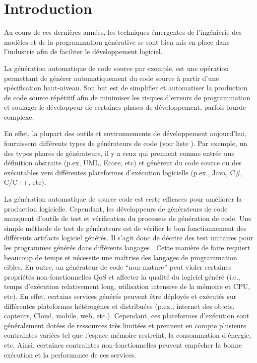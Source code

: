 \chapter*{Introduction}

Au cours de ces dernières années, les techniques émergentes de l’ingénierie des modèles et de la programmation générative se sont bien mis en place dans l’industrie afin de faciliter le développement logiciel.

La génération automatique de code source par exemple, est une opération permettant de générer automatiquement du code source à partir d’une spécification haut-niveau. Son but est de simplifier et automatiser la production de code source répétitif afin de minimiser les risques d'erreurs de programmation et soulager le développeur de certaines phases de développement, parfois lourde complexe.

En effet, la plupart des outils et environnements de développement aujourd’hui, fournissent différents types de générateurs de code (voir liste \cite{liste_generateurs}). Par exemple, un des types phares de générateurs, il y a ceux qui prennent comme entrée une définition abstraite (p.ex, UML, Ecore, etc) et génèrent du code source ou des exécutables vers différentes plateformes d’exécution logicielle (p.ex., Java, C\#, C/C++, etc).

La génération automatique de source code est certe efficaces pour améliorer la production logicielle. Cependant, les développeurs de générateurs de code manquent d’outils de test et vérification du processus de génération de code. Une simple méthode de test de générateurs est de vérifier le bon fonctionnement des différents artifacts logiciel générés. Il s’agit donc de décrire des test unitaires pour les programmes générés dans différents langages . Cette manière de faire requiert beaucoup de temps et nécessite une maîtrise des langages de programmation cibles.
En outre, un générateur de code “non-mature” peut violer certaines propriétés non-fonctionnelles QoS et affecter la qualité du logiciel généré (i.e., temps d'exécution relativement long, utilisation intensive de la mémoire et CPU, etc). En effet, certains services générés peuvent être déployés et exécutés sur différentes plateformes hétérogènes et distribuées (p.ex., internet des objets, capteurs, Cloud, mobile, web, etc.). Cependant, ces plateformes d’exécution sont généralement dotées de ressources très limitées et prennent en compte plusieurs contraintes variées tel que l’espace mémoire restreint, la consommation d’énergie, etc. Ainsi, certaines contraintes non-fonctionnelles peuvent empêcher la bonne exécution et la performance de ces services.


